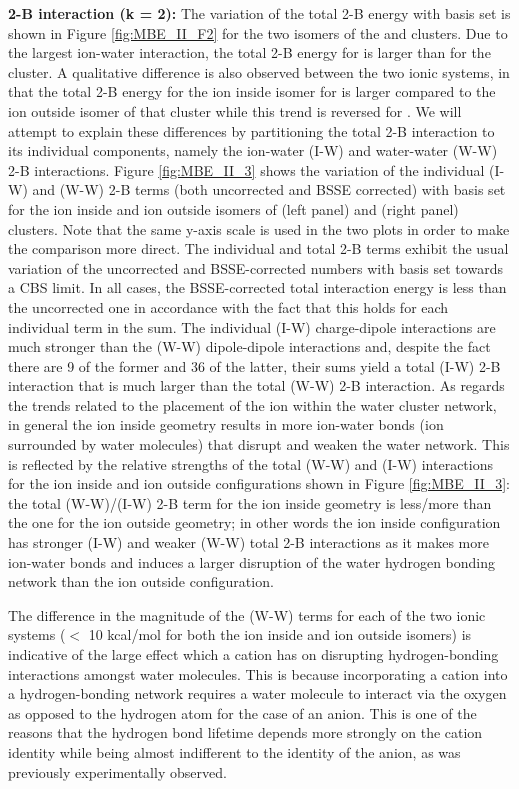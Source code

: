 \documentclass[11pt, proquest]{uwthesis}[2020/02/24]
\let\ce\ch
\begin{document}
\textbf{2-B interaction (k = 2):} The variation of the total 2-B energy with basis set is shown in Figure \ref{fig:MBE_II_F2} for the two isomers of the \ce{Li^+(H2O)9} and \ce{Cl^-(H2O)9} clusters. Due to the largest ion-water interaction, the total 2-B energy for \ce{Li^+(H2O)9} is larger than for the \ce{Cl^-(H2O)9} cluster. A qualitative difference is also observed between the two ionic systems, in that the total 2-B energy for the ion inside isomer for \ce{Li^+(H2O)9} is larger compared to the ion outside isomer of that cluster while this trend is reversed for \ce{Cl^-(H2O)9}. We will attempt to explain these differences by partitioning the total 2-B interaction to its individual components, namely the ion-water (I-W) and water-water (W-W) 2-B interactions. Figure \ref{fig:MBE_II_3} shows the variation of the individual (I-W) and (W-W) 2-B terms (both uncorrected and BSSE corrected) with basis set for the ion inside and ion outside isomers of \ce{Li^+(H2O)9} (left panel) and \ce{Cl^-(H2O)9} (right panel) clusters. Note that the same y-axis scale is used in the two plots in order to make the comparison more direct. The individual and total 2-B terms exhibit the usual variation of the uncorrected and BSSE-corrected numbers with basis set towards a CBS limit. In all cases, the BSSE-corrected total interaction energy is less than the uncorrected one in accordance with the fact that this holds for each individual term in the sum. The individual (I-W) charge-dipole interactions are much stronger than the (W-W) dipole-dipole interactions and, despite the fact there are 9 of the former and 36 of the latter, their sums yield a total (I-W) 2-B interaction that is much larger than the total (W-W) 2-B interaction. As regards the trends related to the placement of the ion within the water cluster network, in general the ion inside geometry results in more ion-water bonds (ion surrounded by water molecules) that disrupt and weaken the water network. This is reflected by the relative strengths of the total (W-W) and (I-W) interactions for the ion inside and ion outside configurations shown in Figure \ref{fig:MBE_II_3}: the total (W-W)/(I-W) 2-B term for the ion inside geometry is less/more than the one for the ion outside geometry; in other words the ion inside configuration has stronger (I-W) and weaker (W-W) total 2-B interactions as it makes more ion-water bonds and induces a larger disruption of the water hydrogen bonding network than the ion outside configuration.




\par The difference in the magnitude of the (W-W) terms for each of the two ionic systems ($<$ 10 kcal/mol for both the ion inside and ion outside isomers) is indicative of the large effect which a cation has on disrupting hydrogen-bonding interactions amongst water molecules. This is because incorporating a cation into a hydrogen-bonding network requires a water molecule to interact via the oxygen as opposed to the hydrogen atom for the case of an anion. This is one of the reasons that the hydrogen bond lifetime depends more strongly on the cation identity while being almost indifferent to the identity of the anion, as was previously experimentally observed.\autocite{shalit_terahertz_2017}
\end{document}
